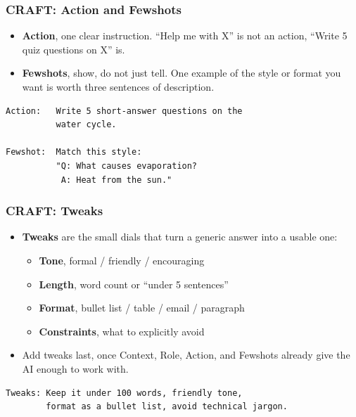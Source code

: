 \begin{frame}[fragile]\frametitle{CRAFT: Action and Fewshots}

\begin{itemize}
    \item \textbf{Action}, one clear instruction. ``Help me with X'' is not an action, ``Write 5 quiz questions on X'' is.
    \item \textbf{Fewshots}, show, do not just tell. One example of the style or format you want is worth three sentences of description.
\end{itemize}

\begin{lstlisting}[language=HTML]
Action:   Write 5 short-answer questions on the
          water cycle.

Fewshot:  Match this style:
          "Q: What causes evaporation?
           A: Heat from the sun."
\end{lstlisting}

\end{frame}

\begin{frame}[fragile]\frametitle{CRAFT: Tweaks}

\begin{itemize}
    \item \textbf{Tweaks} are the small dials that turn a generic answer into a usable one:
    \begin{itemize}
        \item \textbf{Tone}, formal / friendly / encouraging
        \item \textbf{Length}, word count or ``under 5 sentences''
        \item \textbf{Format}, bullet list / table / email / paragraph
        \item \textbf{Constraints}, what to explicitly avoid
    \end{itemize}
    \item Add tweaks last, once Context, Role, Action, and Fewshots already give the AI enough to work with.
\end{itemize}

\begin{lstlisting}[language=HTML]
Tweaks: Keep it under 100 words, friendly tone,
        format as a bullet list, avoid technical jargon.
\end{lstlisting}

\end{frame}

